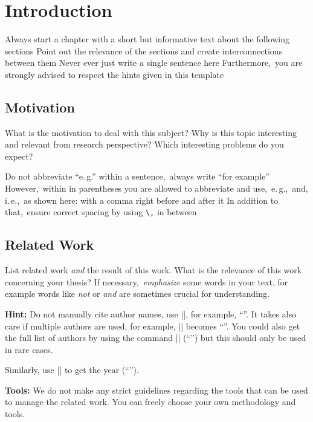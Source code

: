 \chapter{Introduction} \label{chap:intro}
Always start a chapter with a short but informative text about the following sections Point out the relevance of the sections and create interconnections between them Never ever just write a single sentence here Furthermore,\ you are strongly advised to respect the hints given in this template

\section{Motivation}
What is the motivation to deal with this subject?
Why is this topic interesting and relevant from research perspective?
Which interesting problems do you expect?

Do not abbreviate \enquote{e.\,g.\/} within a sentence,\ always write \enquote{for example} However,\ within in parentheses you are allowed to abbreviate and use,\ e.\,g.,\ and, i.\,e.,\ as shown here: with a comma right before and after it In addition to that,\ ensure correct spacing by using \texttt{\textbackslash,} in between

\section{Related Work}
List related work \emph{and} the result of this work. What is the relevance of this work concerning your thesis? If necessary,\ \emph{emphasize} some words in your text, for example words like \emph{not} or \emph{and} are sometimes crucial for understanding.

\textbf{Hint:} Do not manually cite author names, use \code|\citeauthor{Newsome:05:DTA}|, for example, \enquote{\citeauthor{Newsome:05:DTA}}.
It takes also care if multiple authors are used, for example, \code|\citeauthor{AviramSSHDSVAHD16}| becomes \enquote{\citeauthor{AviramSSHDSVAHD16}}.
You could also get the full list of authors by using the command \code|\citeauthor*{AviramSSHDSVAHD16}| (\enquote{\citeauthor*{AviramSSHDSVAHD16}}) but this should only be used in rare cases.

Similarly, use \code|\citeyear{Newsome:05:DTA}| to get the year (\enquote{\citeyear{Newsome:05:DTA}}).

\textbf{Tools:}
We do not make any strict guidelines regarding the tools that can be used to manage the related work.
You can freely choose your own methodology and tools.

